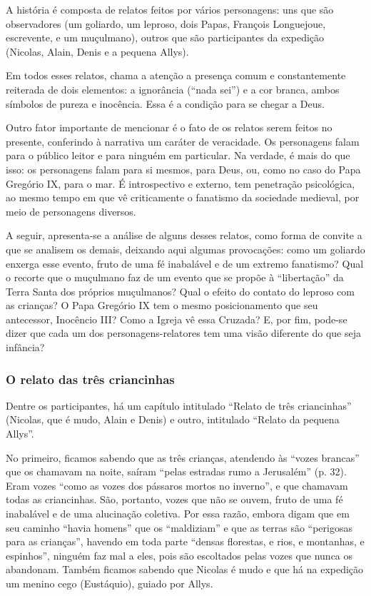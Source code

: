 \documentclass[12pt]{extarticle}
\begin{document}
A história é composta de relatos feitos por vários personagens: uns que
são observadores (um goliardo, um leproso, dois Papas, François
Longuejoue, escrevente, e um muçulmano), outros que são participantes da
expedição (Nicolas, Alain, Denis e a pequena Allys).

Em todos esses relatos, chama a atenção a presença comum e
constantemente reiterada de dois elementos: a ignorância (``nada sei'')
e a cor branca, ambos símbolos de pureza e inocência. Essa é a condição
para se chegar a Deus.

Outro fator importante de mencionar é o fato de os relatos serem feitos
no presente, conferindo à narrativa um caráter de veracidade. Os
personagens falam para o público leitor e para ninguém em particular. Na
verdade, é mais do que isso: os personagens falam para si mesmos, para
Deus, ou, como no caso do Papa Gregório IX, para o mar. É introspectivo
e externo, tem penetração psicológica, ao mesmo tempo em que vê
criticamente o fanatismo da sociedade medieval, por meio de personagens
diversos.

A seguir, apresenta-se a análise de alguns desses relatos, como forma de
convite a que se analisem os demais, deixando aqui algumas provocações:
como um goliardo enxerga esse evento, fruto de uma fé inabalável e de um
extremo fanatismo? Qual o recorte que o muçulmano faz de um evento que
se propõe à ``libertação'' da Terra Santa dos próprios muçulmanos? Qual
o efeito do contato do leproso com as crianças? O Papa Gregório IX tem o
mesmo posicionamento que seu antecessor, Inocêncio III? Como a Igreja vê
essa Cruzada? E, por fim, pode-se dizer que cada um dos
personagens-relatores tem uma visão diferente do que seja infância?

\subsubsection{O relato das três criancinhas}

Dentre os participantes, há um capítulo intitulado ``Relato de três
criancinhas'' (Nicolas, que é mudo, Alain e Denis) e outro, intitulado
``Relato da pequena Allys''.

No primeiro, ficamos sabendo que as três crianças, atendendo às ``vozes
brancas'' que os chamavam na noite, saíram ``pelas estradas rumo a
Jerusalém'' (p. 32). Eram vozes ``como as vozes dos pássaros mortos no
inverno'', e que chamavam todas as criancinhas. São, portanto, vozes que
não se ouvem, fruto de uma fé inabalável e de uma alucinação coletiva.
Por essa razão, embora digam que em seu caminho ``havia homens'' que os
``maldiziam'' e que as terras são ``perigosas para as crianças'',
havendo em toda parte ``densas florestas, e rios, e montanhas, e
espinhos'', ninguém faz mal a eles, pois são escoltados pelas vozes que
nunca os abandonam. Também ficamos sabendo que Nicolas é mudo e que há
na expedição um menino cego (Eustáquio), guiado por Allys.
\end{document}
